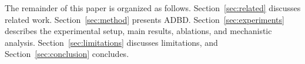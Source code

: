 The remainder of this paper is organized as follows. Section~\ref{sec:related} discusses related work. Section~\ref{sec:method} presents ADBD. Section~\ref{sec:experiments} describes the experimental setup, main results, ablations, and mechanistic analysis. Section~\ref{sec:limitations} discusses limitations, and Section~\ref{sec:conclusion} concludes.